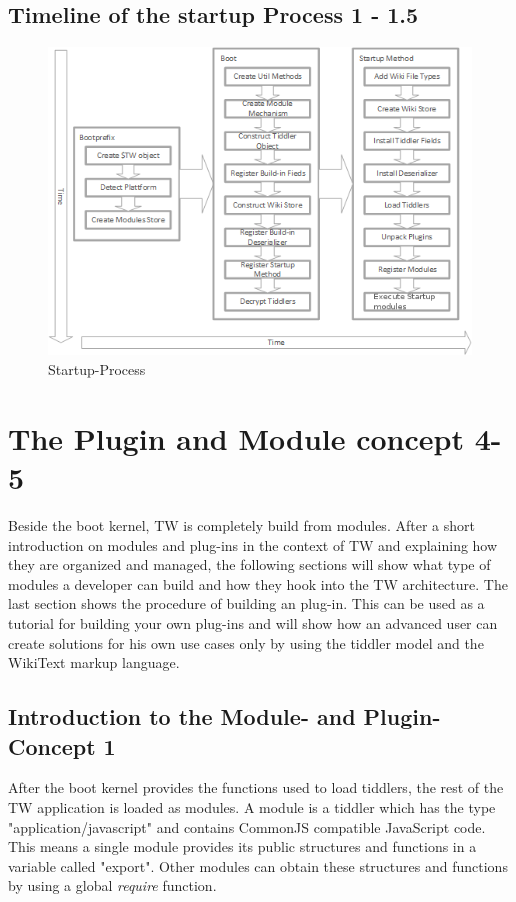 \documentclass[12pt,a4paper]{article}
\newcommand{\todo}[1]{{\bf TODO: #1}\\
}
\begin{document}
\subsection{Timeline of the startup Process 1 - 1.5}
\begin{figure}[hbtp]
\caption{Startup-Process}
\includegraphics[scale=1]{images/StartupTimeline.png}
\end{figure}
\section{The Plugin and Module concept 4-5}
Beside the boot kernel, TW is completely build from modules.
After a short introduction on modules and plug-ins in the context of TW and explaining how they are organized and managed,
the following sections will show what type of modules a developer can build and how they hook into the TW architecture.
The last section shows the procedure of building an plug-in.
This can be used as a tutorial for building your own plug-ins and will show how an advanced user can create solutions for his own use cases only by using the tiddler model and the WikiText markup language.

\subsection{Introduction to the Module- and Plugin-Concept 1}
After the boot kernel provides the functions used to load tiddlers, the rest of the TW application is loaded as modules.
A module is a tiddler which has the type "application/javascript" and contains CommonJS compatible JavaScript code. This means a single module provides its public structures and functions in a variable called "export". Other modules can obtain these structures and functions by using a global \textit{require} function.
\end{document}
